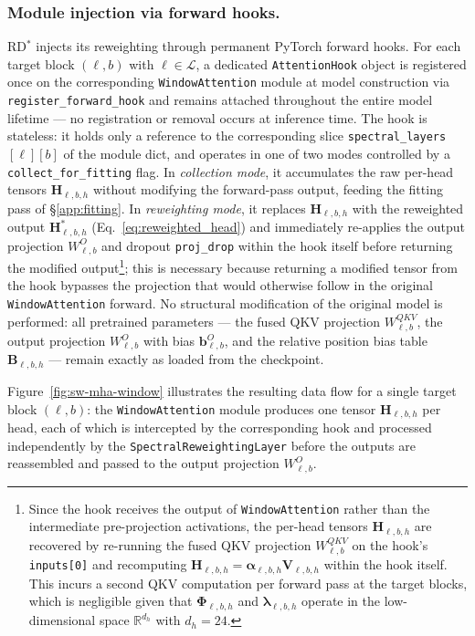 \subsubsection{Module injection via forward hooks.}
RD$^*$\xspace injects its reweighting through permanent PyTorch forward hooks.
For each target block $(\ell, b)$ with $\ell \in \mathcal{L}$, a
dedicated \texttt{AttentionHook} object is registered once on the
corresponding \texttt{WindowAttention} module at model construction via
\texttt{register\_forward\_hook} and remains attached throughout the
entire model lifetime — no registration or removal occurs at inference
time. The hook is stateless: it holds only a reference to the
corresponding slice \texttt{spectral\_layers}$[\ell][b]$ of the module
dict, and operates in one of two modes controlled by a
\texttt{collect\_for\_fitting} flag.
In \emph{collection mode}, it accumulates the raw per-head tensors
$\mathbf{H}_{\ell,b,h}$ without modifying the forward-pass output,
feeding the fitting pass of \S\ref{app:fitting}.
In \emph{reweighting mode}, it replaces $\mathbf{H}_{\ell,b,h}$ with
the reweighted output $\mathbf{H}^*_{\ell,b,h}$
(Eq.~\eqref{eq:reweighted_head}) and immediately re-applies the output
projection $W^O_{\ell,b}$ and dropout \texttt{proj\_drop} within the
hook itself before returning the modified output\footnote{%
    Since the hook receives the output of \texttt{WindowAttention} rather
    than the intermediate pre-projection activations, the per-head tensors
    $\mathbf{H}_{\ell,b,h}$ are recovered by re-running the fused QKV
    projection $W^{QKV}_{\ell,b}$ on the hook's \texttt{inputs[0]} and
    recomputing $\mathbf{H}_{\ell,b,h} = \boldsymbol{\alpha}_{\ell,b,h}
    \mathbf{V}_{\ell,b,h}$ within the hook itself. This incurs a second
    QKV computation per forward pass at the target blocks, which is
    negligible given that $\boldsymbol{\Phi}_{\ell,b,h}$ and
    $\boldsymbol{\lambda}_{\ell,b,h}$ operate in the low-dimensional
    space $\mathbb{R}^{d_h}$ with $d_h = 24$.%
}; this is necessary
because returning a modified tensor from the hook bypasses the
projection that would otherwise follow in the original
\texttt{WindowAttention} forward.
No structural modification of the original model is performed: all
pretrained parameters — the fused QKV projection $W^{QKV}_{\ell,b}$,
the output projection $W^O_{\ell,b}$ with bias $\mathbf{b}^O_{\ell,b}$,
and the relative position bias table $\mathbf{B}_{\ell,b,h}$ — remain
exactly as loaded from the checkpoint.

Figure~\ref{fig:sw-mha-window} illustrates the resulting data flow for
a single target block $(\ell, b)$: the \texttt{WindowAttention} module
produces one tensor $\mathbf{H}_{\ell,b,h}$ per head, each of which is
intercepted by the corresponding hook and processed independently by
the \texttt{SpectralReweightingLayer} before the outputs are reassembled
and passed to the output projection $W^O_{\ell,b}$.

